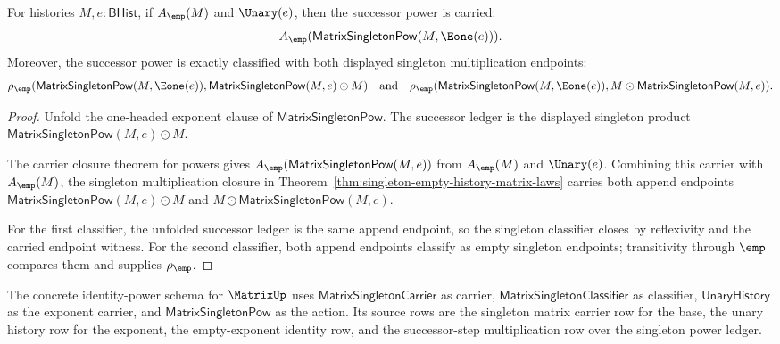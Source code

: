\begin{theorem}
\label{thm:matrix-singleton-pow-successor-endpoint-exactness}
For histories $M,e:\mathsf{BHist}$, if $A_{\emp}(M)$ and $\Unary(e)$, then
the successor power is carried:
$$
A_{\emp}(\mathsf{MatrixSingletonPow}(M,\Eone(e))).
$$
Moreover, the successor power is exactly classified with both displayed
singleton multiplication endpoints:
$$
\rho_{\emp}(\mathsf{MatrixSingletonPow}(M,\Eone(e)),
\mathsf{MatrixSingletonPow}(M,e)\odot M)
\quad\text{and}\quad
\rho_{\emp}(\mathsf{MatrixSingletonPow}(M,\Eone(e)),
M\odot\mathsf{MatrixSingletonPow}(M,e)).
$$
\end{theorem}
\begin{proof}
Unfold the one-headed exponent clause of $\mathsf{MatrixSingletonPow}$. The
successor ledger is the displayed singleton product
$\mathsf{MatrixSingletonPow}(M,e)\odot M$.

The carrier closure theorem for powers gives
$A_{\emp}(\mathsf{MatrixSingletonPow}(M,e))$ from $A_{\emp}(M)$ and
$\Unary(e)$. Combining this carrier with $A_{\emp}(M)$, the singleton
multiplication closure in
Theorem~\ref{thm:singleton-empty-history-matrix-laws} carries both append
endpoints
$\mathsf{MatrixSingletonPow}(M,e)\odot M$ and
$M\odot\mathsf{MatrixSingletonPow}(M,e)$.

For the first classifier, the unfolded successor ledger is the same append
endpoint, so the singleton classifier closes by reflexivity and the carried
endpoint witness. For the second classifier, both append endpoints classify as
empty singleton endpoints; transitivity through $\emp$ compares them and
supplies $\rho_{\emp}$.
\end{proof}

\begin{definition}
\label{def:matrix-singleton-identity-power-concrete-instance}
The concrete identity-power schema for $\MatrixUp$ uses
$\mathsf{MatrixSingletonCarrier}$ as carrier,
$\mathsf{MatrixSingletonClassifier}$ as classifier, $\mathsf{UnaryHistory}$ as
the exponent carrier, and $\mathsf{MatrixSingletonPow}$ as the action. Its
source rows are the singleton matrix carrier row for the base, the unary
history row for the exponent, the empty-exponent identity row, and the
successor-step multiplication row over the singleton power ledger.
\end{definition}

